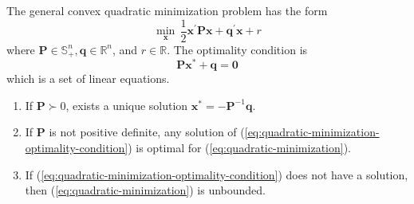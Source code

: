 \begin{example}
	The general convex quadratic minimization problem has the form
	\begin{equation}
		\min_{\mathbf{x}}\,\frac{1}{2}\mathbf{x}^{\prime}\mathbf{P}\mathbf{x}+\mathbf{q}^{\prime}\mathbf{x}+r \label{eq:quadratic-minimization}
	\end{equation}
	where $\mathbf{P}\in\mathbb{S}_{+}^{n},\mathbf{q}\in\mathbb{R}^{n}$, and $r\in\mathbb{R}$. The optimality condition is
	\begin{equation}
		\mathbf{P}\mathbf{x}^{*}+\mathbf{q}=\mathbf{0}
		\label{eq:quadratic-minimization-optimality-condition}
	\end{equation}
	which is a set of linear equations.
	\begin{enumerate}
		\item If $\mathbf{P}\succ 0$, exists a unique solution $\mathbf{x}^{*}=-\mathbf{P}^{-1}\mathbf{q}$.
		\item If $\mathbf{P}$ is not positive definite, any solution of (\ref{eq:quadratic-minimization-optimality-condition}) is optimal for (\ref{eq:quadratic-minimization}).
		\item If (\ref{eq:quadratic-minimization-optimality-condition}) does not have a solution, then (\ref{eq:quadratic-minimization}) is unbounded.
	\end{enumerate}
\end{example}

